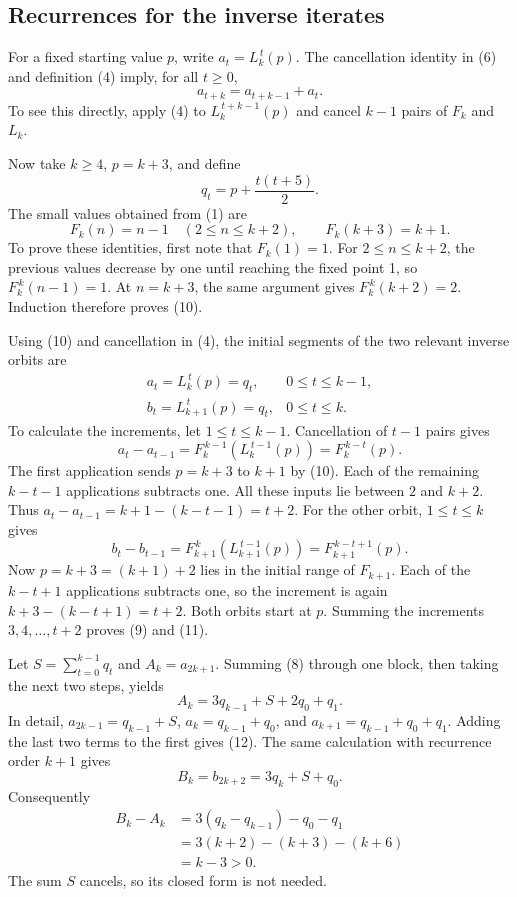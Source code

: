 \documentclass[11pt,a4paper]{article}
\newcommand{\itf}[2]{F_{#1}^{\,#2}}
\newcommand{\itl}[2]{L_{#1}^{\,#2}}
\begin{document}
\subsection{Recurrences for the inverse iterates}

For a fixed starting value \(p\), write \(a_t=\itl{k}{t}(p)\).
The cancellation identity in (6) and definition (4) imply, for all \(t\ge0\),
\[
 a_{t+k}=a_{t+k-1}+a_t.
 \tag{8}
\]
To see this directly, apply (4) to \(\itl{k}{t+k-1}(p)\) and cancel
\(k-1\) pairs of \(F_k\) and \(L_k\).

Now take \(k\ge4\), \(p=k+3\), and define
\[
 q_t=p+\frac{t(t+5)}2.
 \tag{9}
\]
The small values obtained from (1) are
\[
 F_k(n)=n-1\quad(2\le n\le k+2),\qquad F_k(k+3)=k+1.
 \tag{10}
\]
To prove these identities, first note that \(F_k(1)=1\).
For \(2\le n\le k+2\), the previous values decrease by one until
reaching the fixed point 1, so
\(\itf{k}{k}(n-1)=1\). At \(n=k+3\), the same argument gives
\(\itf{k}{k}(k+2)=2\). Induction therefore proves (10).

Using (10) and cancellation in (4), the initial segments of the two relevant
inverse orbits are
\[
 \begin{array}{ll}
 a_t=\itl{k}{t}(p)=q_t,&0\le t\le k-1,\\[2pt]
 b_t=\itl{k+1}{t}(p)=q_t,&0\le t\le k.
 \end{array}
 \tag{11}
\]
To calculate the increments, let $1\leq t\leq k-1$.
Cancellation of $t-1$ pairs gives
\[
 a_t-a_{t-1}=F_k^{\,k-1}(L_k^{\,t-1}(p))
 =F_k^{\,k-t}(p).
\]
The first application sends $p=k+3$ to $k+1$ by (10). Each of the remaining
$k-t-1$ applications subtracts one. All these inputs lie between $2$ and
$k+2$. Thus $a_t-a_{t-1}=k+1-(k-t-1)=t+2$.
For the other orbit, $1\leq t\leq k$ gives
\[
 b_t-b_{t-1}=F_{k+1}^{\,k}(L_{k+1}^{\,t-1}(p))
 =F_{k+1}^{\,k-t+1}(p).
\]
Now $p=k+3=(k+1)+2$ lies in the initial range of $F_{k+1}$.
Each of the $k-t+1$ applications subtracts one, so the increment is again
$k+3-(k-t+1)=t+2$. Both orbits start at $p$. Summing the increments
$3,4,\ldots,t+2$ proves (9) and (11).

Let \(S=\sum_{t=0}^{k-1}q_t\) and \(A_k=a_{2k+1}\). Summing (8) through one
block, then taking the next two steps, yields
\[
 A_k=3q_{k-1}+S+2q_0+q_1.
 \tag{12}
\]
In detail, \(a_{2k-1}=q_{k-1}+S\),
\(a_k=q_{k-1}+q_0\), and
\(a_{k+1}=q_{k-1}+q_0+q_1\). Adding the last two terms to the first gives (12).
The same calculation with recurrence order \(k+1\) gives
\[
 B_k=b_{2k+2}=3q_k+S+q_0.
 \tag{13}
\]
Consequently
\begin{align*}
 B_k-A_k
 &=3(q_k-q_{k-1})-q_0-q_1\\
 &=3(k+2)-(k+3)-(k+6)\\
 &=k-3>0.
 \tag{14}
\end{align*}
The sum \(S\) cancels, so its closed form is not needed.
\end{document}
